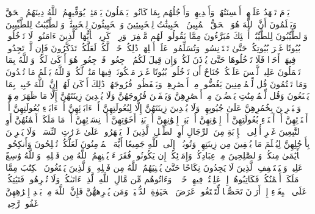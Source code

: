 \startbuffer[\q:24:24]
یَوۡمَ تَشۡهَدُ عَلَیۡهِمۡ أَلۡسِنَتُهُمۡ وَأَیۡدِیهِمۡ وَأَرۡجُلُهُم بِمَا كَانُوا۟ یَعۡمَلُونَ%
\stopbuffer%
\startbuffer[\q:24:25]
یَوۡمَئِذࣲ یُوَفِّیهِمُ ٱللَّهُ دِینَهُمُ ٱلۡحَقَّ وَیَعۡلَمُونَ أَنَّ ٱللَّهَ هُوَ ٱلۡحَقُّ ٱلۡمُبِینُ%
\stopbuffer%
\startbuffer[\q:24:26]
ٱلۡخَبِیثَٰتُ لِلۡخَبِیثِینَ وَٱلۡخَبِیثُونَ لِلۡخَبِیثَٰتِۖ وَٱلطَّیِّبَٰتُ لِلطَّیِّبِینَ وَٱلطَّیِّبُونَ لِلطَّیِّبَٰتِۚ أُو۟لَٰۤئِكَ مُبَرَّءُونَ مِمَّا یَقُولُونَۖ لَهُم مَّغۡفِرَةࣱ وَرِزۡقࣱ كَرِیمࣱ%
\stopbuffer%
\startbuffer[\q:24:27]
یَٰۤأَیُّهَا ٱلَّذِینَ ءَامَنُوا۟ لَا تَدۡخُلُوا۟ بُیُوتًا غَیۡرَ بُیُوتِكُمۡ حَتَّىٰ تَسۡتَأۡنِسُوا۟ وَتُسَلِّمُوا۟ عَلَىٰۤ أَهۡلِهَاۚ ذَٰلِكُمۡ خَیۡرࣱ لَّكُمۡ لَعَلَّكُمۡ تَذَكَّرُونَ%
\stopbuffer%
\startbuffer[\q:24:28]
فَإِن لَّمۡ تَجِدُوا۟ فِیهَاۤ أَحَدࣰا فَلَا تَدۡخُلُوهَا حَتَّىٰ یُؤۡذَنَ لَكُمۡۖ وَإِن قِیلَ لَكُمُ ٱرۡجِعُوا۟ فَٱرۡجِعُوا۟ۖ هُوَ أَزۡكَىٰ لَكُمۡۚ وَٱللَّهُ بِمَا تَعۡمَلُونَ عَلِیمࣱ%
\stopbuffer%
\startbuffer[\q:24:29]
لَّیۡسَ عَلَیۡكُمۡ جُنَاحٌ أَن تَدۡخُلُوا۟ بُیُوتًا غَیۡرَ مَسۡكُونَةࣲ فِیهَا مَتَٰعࣱ لَّكُمۡۚ وَٱللَّهُ یَعۡلَمُ مَا تُبۡدُونَ وَمَا تَكۡتُمُونَ%
\stopbuffer%
\startbuffer[\q:24:30]
قُل لِّلۡمُؤۡمِنِینَ یَغُضُّوا۟ مِنۡ أَبۡصَٰرِهِمۡ وَیَحۡفَظُوا۟ فُرُوجَهُمۡۚ ذَٰلِكَ أَزۡكَىٰ لَهُمۡۚ إِنَّ ٱللَّهَ خَبِیرُۢ بِمَا یَصۡنَعُونَ%
\stopbuffer%
\startbuffer[\q:24:31]
وَقُل لِّلۡمُؤۡمِنَٰتِ یَغۡضُضۡنَ مِنۡ أَبۡصَٰرِهِنَّ وَیَحۡفَظۡنَ فُرُوجَهُنَّ وَلَا یُبۡدِینَ زِینَتَهُنَّ إِلَّا مَا ظَهَرَ مِنۡهَاۖ وَلۡیَضۡرِبۡنَ بِخُمُرِهِنَّ عَلَىٰ جُیُوبِهِنَّۖ وَلَا یُبۡدِینَ زِینَتَهُنَّ إِلَّا لِبُعُولَتِهِنَّ أَوۡ ءَابَاۤئِهِنَّ أَوۡ ءَابَاۤءِ بُعُولَتِهِنَّ أَوۡ أَبۡنَاۤئِهِنَّ أَوۡ أَبۡنَاۤءِ بُعُولَتِهِنَّ أَوۡ إِخۡوَٰنِهِنَّ أَوۡ بَنِیۤ إِخۡوَٰنِهِنَّ أَوۡ بَنِیۤ أَخَوَٰتِهِنَّ أَوۡ نِسَاۤئِهِنَّ أَوۡ مَا مَلَكَتۡ أَیۡمَٰنُهُنَّ أَوِ ٱلتَّٰبِعِینَ غَیۡرِ أُو۟لِی ٱلۡإِرۡبَةِ مِنَ ٱلرِّجَالِ أَوِ ٱلطِّفۡلِ ٱلَّذِینَ لَمۡ یَظۡهَرُوا۟ عَلَىٰ عَوۡرَٰتِ ٱلنِّسَاۤءِۖ وَلَا یَضۡرِبۡنَ بِأَرۡجُلِهِنَّ لِیُعۡلَمَ مَا یُخۡفِینَ مِن زِینَتِهِنَّۚ وَتُوبُوۤا۟ إِلَى ٱللَّهِ جَمِیعًا أَیُّهَ ٱلۡمُؤۡمِنُونَ لَعَلَّكُمۡ تُفۡلِحُونَ%
\stopbuffer%
\startbuffer[\q:24:32]
وَأَنكِحُوا۟ ٱلۡأَیَٰمَىٰ مِنكُمۡ وَٱلصَّٰلِحِینَ مِنۡ عِبَادِكُمۡ وَإِمَاۤئِكُمۡۚ إِن یَكُونُوا۟ فُقَرَاۤءَ یُغۡنِهِمُ ٱللَّهُ مِن فَضۡلِهِۦۗ وَٱللَّهُ وَٰسِعٌ عَلِیمࣱ%
\stopbuffer%
\startbuffer[\q:24:33]
وَلۡیَسۡتَعۡفِفِ ٱلَّذِینَ لَا یَجِدُونَ نِكَاحًا حَتَّىٰ یُغۡنِیَهُمُ ٱللَّهُ مِن فَضۡلِهِۦۗ وَٱلَّذِینَ یَبۡتَغُونَ ٱلۡكِتَٰبَ مِمَّا مَلَكَتۡ أَیۡمَٰنُكُمۡ فَكَاتِبُوهُمۡ إِنۡ عَلِمۡتُمۡ فِیهِمۡ خَیۡرࣰاۖ وَءَاتُوهُم مِّن مَّالِ ٱللَّهِ ٱلَّذِیۤ ءَاتَىٰكُمۡۚ وَلَا تُكۡرِهُوا۟ فَتَیَٰتِكُمۡ عَلَى ٱلۡبِغَاۤءِ إِنۡ أَرَدۡنَ تَحَصُّنࣰا لِّتَبۡتَغُوا۟ عَرَضَ ٱلۡحَیَوٰةِ ٱلدُّنۡیَاۚ وَمَن یُكۡرِههُّنَّ فَإِنَّ ٱللَّهَ مِنۢ بَعۡدِ إِكۡرَٰهِهِنَّ غَفُورࣱ رَّحِیمࣱ%
